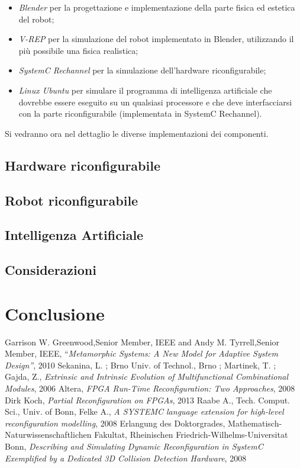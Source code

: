 \documentclass[11pt]{article} %
\begin{document}
\begin{itemize}
  \item \textit{Blender} per la progettazione e implementazione della parte fisica ed estetica del robot;
  \item \textit{V-REP} per la simulazione del robot implementato in Blender, utilizzando il più possibile una fisica realistica;
  \item \textit{SystemC Rechannel} per la simulazione dell'hardware riconfigurabile;
  \item \textit{Linux Ubuntu} per simulare il programma di intelligenza artificiale che dovrebbe essere eseguito su un qualsiasi processore e che deve interfacciarsi con la parte riconfigurabile (implementata in SystemC Rechannel).
\end{itemize}

Si vedranno ora nel dettaglio le diverse implementazioni dei componenti.

\subsection{Hardware riconfigurabile}

\subsection{Robot riconfigurabile}

\subsection{Intelligenza Artificiale}

\subsection{Considerazioni}

\section{Conclusione}



\begin{thebibliography}{1}
 Garrison W. Greenwood,Senior Member, IEEE and Andy M. Tyrrell,Senior Member, IEEE, ``\textit{Metamorphic Systems: A New Model for Adaptive System Design''}, 2010
 Sekanina, L. ; Brno Univ. of Technol., Brno ; Martinek, T. ; Gajda, Z., \textit{Extrinsic and Intrinsic Evolution of Multifunctional Combinational Modules}, 2006
 Altera, \textit{FPGA Run-Time Reconfiguration: Two Approaches}, 2008
 Dirk Koch, \textit{Partial Reconfiguration on FPGAs}, 2013
 Raabe A., Tech. Comput. Sci., Univ. of Bonn, Felke A., \textit{A SYSTEMC language extension for high-level reconfiguration modelling}, 2008
 Erlangung des Doktorgrades, Mathematisch-Naturwissenschaftlichen Fakultat, Rheinischen Friedrich-Wilhelms-Universitat Bonn, \textit{Describing and Simulating Dynamic Reconfiguration in SystemC Exemplified by a Dedicated 3D Collision Detection Hardware}, 2008
\end{thebibliography}
\end{document}

